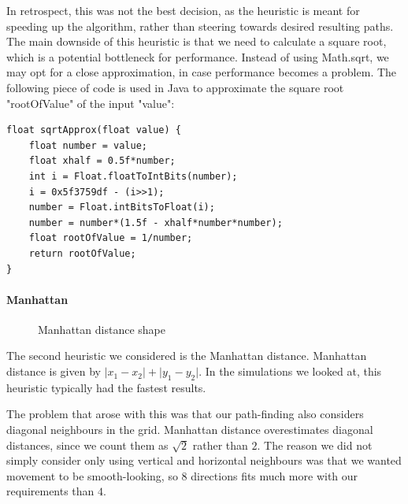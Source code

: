 In retrospect, this was not the best decision, as the heuristic is meant for speeding up the algorithm, rather than steering towards desired resulting paths. The main downside of this heuristic is that we need to calculate a square root, which is a potential bottleneck for performance. Instead of using Math.sqrt, we may opt for a close approximation, in case performance becomes a problem. The following piece of code is used in Java to approximate the square root "rootOfValue" of the input "value":
\begin{lstlisting}
float sqrtApprox(float value) {
	float number = value;
	float xhalf = 0.5f*number;
	int i = Float.floatToIntBits(number);
	i = 0x5f3759df - (i>>1);
	number = Float.intBitsToFloat(i);
	number = number*(1.5f - xhalf*number*number);
	float rootOfValue = 1/number;
	return rootOfValue;
}
\end{lstlisting}

\paragraph{Manhattan}
\begin{figure}
\caption{Manhattan distance shape}
\end{figure}
The second heuristic we considered is the Manhattan distance. Manhattan distance is given by $\lvert x_1 - x_2 \rvert + \lvert y_1 - y_2 \rvert$. In the simulations we looked at, this heuristic typically had the fastest results. 

The problem that arose with this was that our path-finding also considers diagonal neighbours in the grid. Manhattan distance overestimates diagonal distances, since we count them as $\sqrt{2}$ rather than $2$. The reason we did not simply consider only using vertical and horizontal neighbours was that we wanted movement to be smooth-looking, so $8$ directions fits much more with our requirements than $4$.

